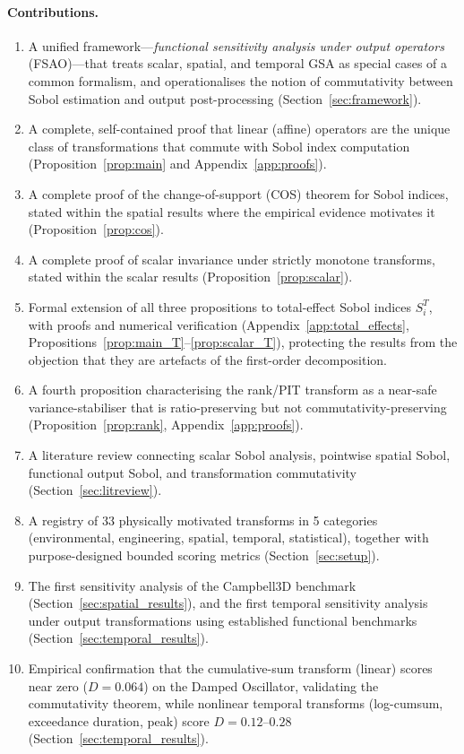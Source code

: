 \documentclass[11pt,onecolumn]{article}
\begin{document}
\paragraph{Contributions.}
\begin{enumerate}
  \item A unified framework---\emph{functional sensitivity analysis under output
    operators} (FSAO)---that treats scalar, spatial, and temporal GSA as
    special cases of a common formalism, and operationalises the notion of
    commutativity between Sobol estimation and output post-processing
    (Section~\ref{sec:framework}).
  \item A complete, self-contained proof that linear (affine) operators are the
    unique class of transformations that commute with Sobol index computation
    (Proposition~\ref{prop:main} and Appendix~\ref{app:proofs}).
  \item A complete proof of the change-of-support (COS) theorem for Sobol
    indices, stated within the spatial results where the empirical evidence
    motivates it (Proposition~\ref{prop:cos}).
  \item A complete proof of scalar invariance under strictly monotone transforms,
    stated within the scalar results (Proposition~\ref{prop:scalar}).
  \item Formal extension of all three propositions to total-effect Sobol indices
    $S_i^T$, with proofs and numerical verification (Appendix~\ref{app:total_effects},
    Propositions~\ref{prop:main_T}--\ref{prop:scalar_T}), protecting the results
    from the objection that they are artefacts of the first-order decomposition.
  \item A fourth proposition characterising the rank/PIT transform as a
    near-safe variance-stabiliser that is ratio-preserving but not commutativity-preserving
    (Proposition~\ref{prop:rank}, Appendix~\ref{app:proofs}).
  \item A literature review connecting scalar Sobol analysis, pointwise spatial
    Sobol, functional output Sobol, and transformation commutativity
    (Section~\ref{sec:litreview}).
  \item A registry of 33 physically motivated transforms in 5 categories
    (environmental, engineering, spatial, temporal, statistical), together with
    purpose-designed bounded scoring metrics (Section~\ref{sec:setup}).
  \item The first sensitivity analysis of the Campbell3D benchmark
    (Section~\ref{sec:spatial_results}), and the first temporal sensitivity
    analysis under output transformations using established functional benchmarks
    (Section~\ref{sec:temporal_results}).
  \item Empirical confirmation that the cumulative-sum transform (linear)
    scores near zero ($D = 0.064$) on the Damped Oscillator, validating the
    commutativity theorem, while nonlinear temporal transforms
    (log-cumsum, exceedance duration, peak) score $D = 0.12$--$0.28$
    (Section~\ref{sec:temporal_results}).
\end{enumerate}
\end{document}
